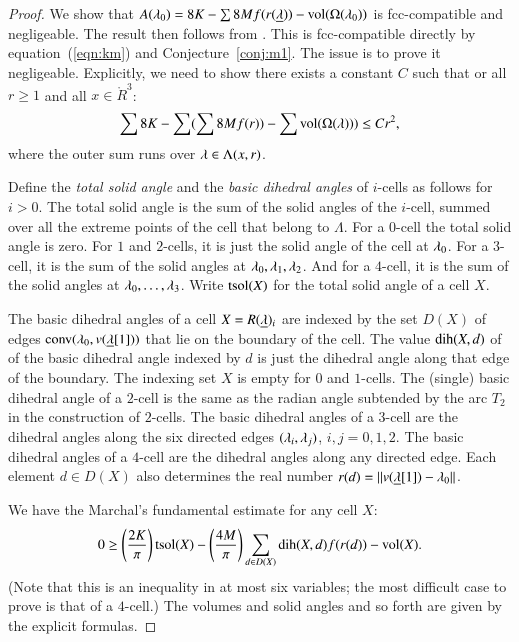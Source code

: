 \begin{proof} 
We show that $A(\lambda_0)  = 8 K - \sum 8 M f(r({\underline{\lambda}})) -{\operatorname{vol}}(\Omega(\lambda_0))$ is fcc-compatible and negligeable.  The
result then follows from \cite[Lemma~3.3]{DCG}.  This is fcc-compatible directly
by equation~(\ref{eqn:km})
and Conjecture~\ref{conj:m1}.  The issue is to prove it negligeable.  Explicitly, we need
to show there exists a constant  $C$ such that or all $r\ge 1$ and all $x\in\ring{R}^3$:
\begin{equation}\label{eqn:neg}
\sum 8K - \sum (\sum 8 M f(r)) - \sum {\operatorname{vol}}(\Omega(\lambda))) \le C r^2,
\end{equation}
where the outer sum runs over $\lambda\in \Lambda(x,r)$.


Define the {\it total solid angle} and the {\it basic dihedral angles} of $i$-cells as follows for
$i>0$.  The total solid angle is the sum of the solid angles of the $i$-cell, summed
over all the extreme points of the cell that belong to $\Lambda$.  For a $0$-cell
the total solid angle is zero. For $1$ and $2$-cells,
it is just the solid angle of the cell at $\lambda_0$.  For a $3$-cell, it is the sum of the
solid angles at $\lambda_0,\lambda_1,\lambda_2$.  And for a $4$-cell, it is the sum of the solid
angles at $\lambda_0,\ldots,\lambda_3$. Write ${\operatorname{tsol}}(X)$ for the total solid angle of a cell $X$.


The  basic dihedral angles of a cell $X = R({\underline{\lambda}})_i$ are indexed by the set $D(X)$ of
edges ${\operatorname{conv}}(\lambda_0,v({\underline{\lambda}}[1]))$ that lie on the boundary of the cell.  The value
$\operatorname{dih}(X,d)$ of
of the basic dihedral angle indexed by $d$ is just the dihedral angle along that edge
of the boundary.  The indexing set $X$ is empty for  $0$ and $1$-cells.
The (single) basic  dihedral angle of a $2$-cell is
the same as the radian angle subtended by the arc $T_2$ in the construction of $2$-cells.
The basic dihedral angles of a $3$-cell are the dihedral angles along the
six directed edges $(\lambda_i,\lambda_j)$, $i,j=0,1,2$.  The basic dihedral angles of a $4$-cell are
the dihedral angles along any directed edge.  Each element $d\in D(X)$ also determines
the real number $r(d) = {\|v({\underline{\lambda}}[1])-\lambda_0\|}$.

We have the Marchal's fundamental estimate for any cell $X$:
\begin{equation}\label{eqn:mfe}
0 \ge \left(\frac{2K}{\pi}\right) {\operatorname{tsol}}(X) - \left(\frac{4M}{\pi}\right)
\sum_{d\in D(X)} \operatorname{dih}(X,d) f(r(d)) - {\operatorname{vol}}(X).
\end{equation}
(Note that this is an inequality in at most six variables; the most difficult case to prove
is that of a $4$-cell.)  The volumes and solid angles and so forth are given by the 
explicit formulas.


\end{proof}
